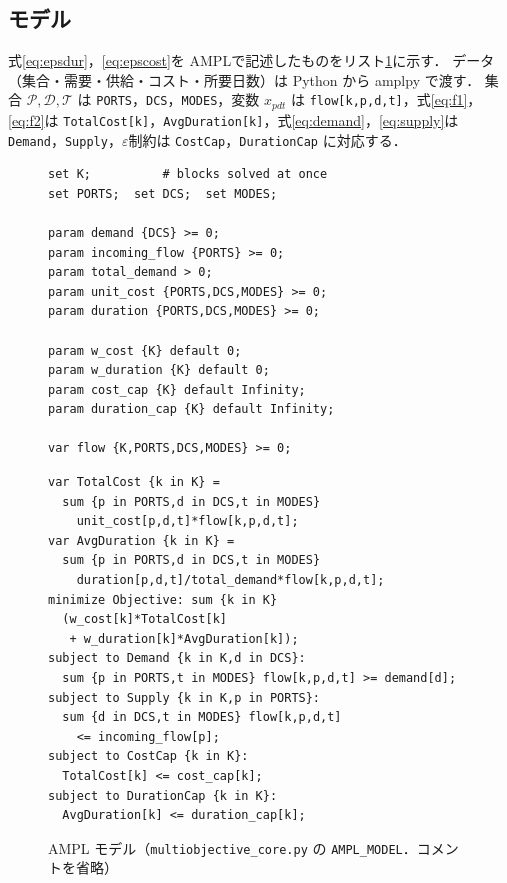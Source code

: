 \documentclass[a4paper,11pt]{ltjsarticle}
\newcommand{\Pset}{\mathcal{P}}
\newcommand{\Dset}{\mathcal{D}}
\newcommand{\Tset}{\mathcal{T}}
\begin{document}
\subsection{モデル}
式\eqref{eq:epsdur}，\eqref{eq:epscost}を AMPL\cite{ampl}で記述したものをリスト\ref{lst:mod}に示す．
データ（集合・需要・供給・コスト・所要日数）は Python から amplpy で渡す．
集合 $\Pset,\Dset,\Tset$ は \texttt{PORTS}，\texttt{DCS}，\texttt{MODES}，変数 $x_{pdt}$ は \texttt{flow[k,p,d,t]}，式\eqref{eq:f1}，\eqref{eq:f2}は \texttt{TotalCost[k]}，\texttt{AvgDuration[k]}，式\eqref{eq:demand}，\eqref{eq:supply}は \texttt{Demand}，\texttt{Supply}，$\varepsilon$制約は \texttt{CostCap}，\texttt{DurationCap} に対応する．


\begin{figure}[tbp]
\begin{minipage}[t]{0.40\linewidth}
\begin{lstlisting}[xleftmargin=1.5em]
set K;          # blocks solved at once
set PORTS;  set DCS;  set MODES;

param demand {DCS} >= 0;
param incoming_flow {PORTS} >= 0;
param total_demand > 0;
param unit_cost {PORTS,DCS,MODES} >= 0;
param duration {PORTS,DCS,MODES} >= 0;

param w_cost {K} default 0;
param w_duration {K} default 0;
param cost_cap {K} default Infinity;
param duration_cap {K} default Infinity;

var flow {K,PORTS,DCS,MODES} >= 0;
\end{lstlisting}
\end{minipage}\hfill
\begin{minipage}[t]{0.58\linewidth}
\begin{lstlisting}[firstnumber=16, xleftmargin=1.5em]
var TotalCost {k in K} =
  sum {p in PORTS,d in DCS,t in MODES}
    unit_cost[p,d,t]*flow[k,p,d,t];
var AvgDuration {k in K} =
  sum {p in PORTS,d in DCS,t in MODES}
    duration[p,d,t]/total_demand*flow[k,p,d,t];
minimize Objective: sum {k in K}
  (w_cost[k]*TotalCost[k]
   + w_duration[k]*AvgDuration[k]);
subject to Demand {k in K,d in DCS}:
  sum {p in PORTS,t in MODES} flow[k,p,d,t] >= demand[d];
subject to Supply {k in K,p in PORTS}:
  sum {d in DCS,t in MODES} flow[k,p,d,t]
    <= incoming_flow[p];
subject to CostCap {k in K}:
  TotalCost[k] <= cost_cap[k];
subject to DurationCap {k in K}:
  AvgDuration[k] <= duration_cap[k];
\end{lstlisting}
\end{minipage}
\lstcaptype
\caption{AMPL モデル（\texttt{multiobjective\_core.py} の \texttt{AMPL\_MODEL}．コメントを省略）}\label{lst:mod}
\end{figure}
\end{document}
